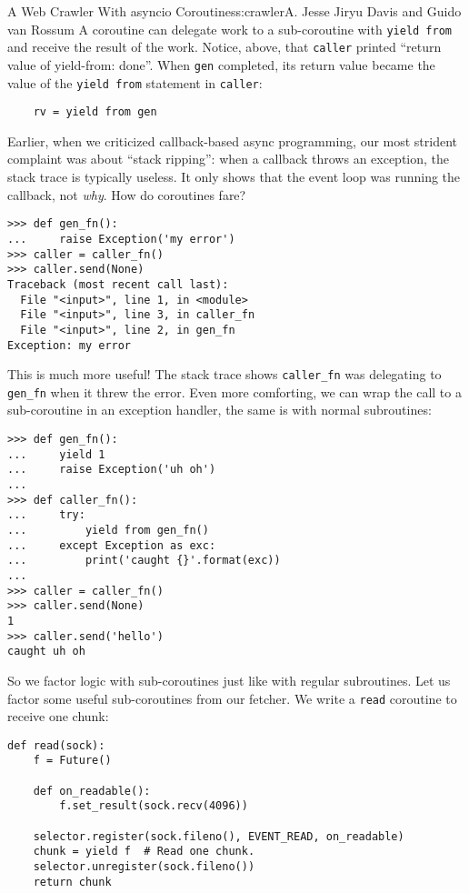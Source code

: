 \begin{aosachapter}{A Web Crawler With asyncio Coroutines}{s:crawler}{A. Jesse Jiryu Davis and Guido van Rossum}
A coroutine can delegate work to a sub-coroutine with
\texttt{yield from} and receive the result of the work. Notice, above,
that \texttt{caller} printed ``return value of yield-from: done''. When
\texttt{gen} completed, its return value became the value of the
\texttt{yield from} statement in \texttt{caller}:

\begin{verbatim}
    rv = yield from gen
\end{verbatim}

Earlier, when we criticized callback-based async programming, our most
strident complaint was about ``stack ripping'': when a callback throws
an exception, the stack trace is typically useless. It only shows that
the event loop was running the callback, not \emph{why}. How do
coroutines fare?

\begin{verbatim}
>>> def gen_fn():
...     raise Exception('my error')
>>> caller = caller_fn()
>>> caller.send(None)
Traceback (most recent call last):
  File "<input>", line 1, in <module>
  File "<input>", line 3, in caller_fn
  File "<input>", line 2, in gen_fn
Exception: my error
\end{verbatim}

This is much more useful! The stack trace shows \texttt{caller\_fn} was
delegating to \texttt{gen\_fn} when it threw the error. Even more
comforting, we can wrap the call to a sub-coroutine in an exception
handler, the same is with normal subroutines:

\begin{verbatim}
>>> def gen_fn():
...     yield 1
...     raise Exception('uh oh')
...
>>> def caller_fn():
...     try:
...         yield from gen_fn()
...     except Exception as exc:
...         print('caught {}'.format(exc))
...
>>> caller = caller_fn()
>>> caller.send(None)
1
>>> caller.send('hello')
caught uh oh
\end{verbatim}

So we factor logic with sub-coroutines just like with regular
subroutines. Let us factor some useful sub-coroutines from our fetcher.
We write a \texttt{read} coroutine to receive one chunk:

\begin{verbatim}
def read(sock):
    f = Future()

    def on_readable():
        f.set_result(sock.recv(4096))

    selector.register(sock.fileno(), EVENT_READ, on_readable)
    chunk = yield f  # Read one chunk.
    selector.unregister(sock.fileno())
    return chunk
\end{verbatim}


\end{aosachapter}
